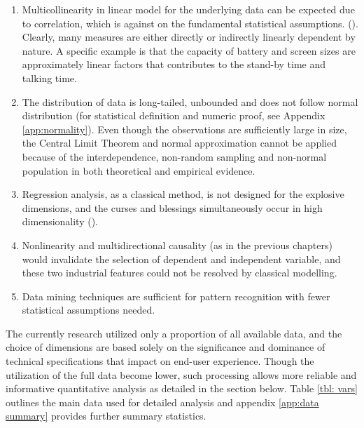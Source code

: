 \documentclass[utf8,english]{gradu3}
\begin{document}
\begin{enumerate}
    \item Multicollinearity in linear model for the underlying data can be expected due to correlation, which is against on the fundamental statistical assumptions. (\cite{farrar1967multicollinearity}). Clearly, many measures are either directly or indirectly linearly dependent by nature. A specific example is that the capacity of battery and screen sizes are approximately linear factors that contributes to the stand-by time and talking time. 
    \item The distribution of data is long-tailed, unbounded and does not follow normal distribution (for statistical definition and numeric proof, see Appendix \ref{app:normality}). Even though the observations are sufficiently large in size, the Central Limit Theorem and normal approximation cannot be applied because of the interdependence, non-random sampling and non-normal population in both theoretical and empirical evidence.
    \item Regression analysis, as a classical method, is not designed for the explosive dimensions, and the curses and blessings simultaneously occur in high dimensionality (\cite{donoho2000high}).
    \item Nonlinearity and multidirectional causality (as in the previous chapters) would invalidate the selection of dependent and independent variable, and these two industrial features could not be resolved by classical modelling.
    \item Data mining techniques are sufficient for pattern recognition with fewer statistical assumptions needed.
\end{enumerate}

The currently research utilized only a proportion of all available data, and the choice of dimensions are based solely on the significance and dominance of technical specifications that impact on end-user experience. Though the utilization of the full data become lower, such processing allows more reliable and informative quantitative analysis as detailed in the section below. Table \ref{tbl: vars} outlines the main data used for detailed analysis and appendix \ref{app:data summary} provides further summary statistics.
\end{document}
